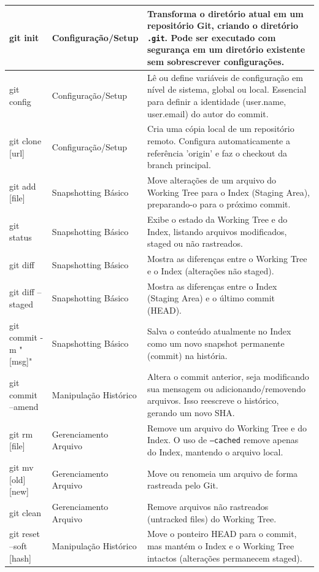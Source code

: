 \begin{longtable}{|p{3cm}|p{4cm}|p{7cm}|}
    git init & Configuração/Setup & Transforma o diretório atual em um repositório Git, criando o diretório \texttt{.git}. Pode ser executado com segurança em um diretório existente sem sobrescrever configurações. \\
    \hline
    git config & Configuração/Setup & Lê ou define variáveis de configuração em nível de sistema, global ou local. Essencial para definir a identidade (user.name, user.email) do autor do commit. \\
    \hline
    git clone [url] & Configuração/Setup & Cria uma cópia local de um repositório remoto. Configura automaticamente a referência 'origin' e faz o checkout da branch principal. \\
    \hline
    git add [file] & Snapshotting Básico & Move alterações de um arquivo do Working Tree para o Index (Staging Area), preparando-o para o próximo commit. \\
    \hline
    git status & Snapshotting Básico & Exibe o estado da Working Tree e do Index, listando arquivos modificados, staged ou não rastreados. \\
    \hline
    git diff & Snapshotting Básico & Mostra as diferenças entre o Working Tree e o Index (alterações não staged). \\
    \hline
    git diff --staged & Snapshotting Básico & Mostra as diferenças entre o Index (Staging Area) e o último commit (HEAD). \\
    \hline
    git commit -m "[msg]" & Snapshotting Básico & Salva o conteúdo atualmente no Index como um novo snapshot permanente (commit) na história. \\
    \hline
    git commit --amend & Manipulação Histórico & Altera o commit anterior, seja modificando sua mensagem ou adicionando/removendo arquivos. Isso reescreve o histórico, gerando um novo SHA. \\
    \hline
    git rm [file] & Gerenciamento Arquivo & Remove um arquivo do Working Tree e do Index. O uso de \texttt{--cached} remove apenas do Index, mantendo o arquivo local. \\
    \hline
    git mv [old][new] & Gerenciamento Arquivo & Move ou renomeia um arquivo de forma rastreada pelo Git. \\
    \hline
    git clean & Gerenciamento Arquivo & Remove arquivos não rastreados (untracked files) do Working Tree. \\
    \hline
    git reset --soft [hash] & Manipulação Histórico & Move o ponteiro HEAD para o commit, mas mantém o Index e o Working Tree intactos (alterações permanecem staged). \\

\end{longtable}
